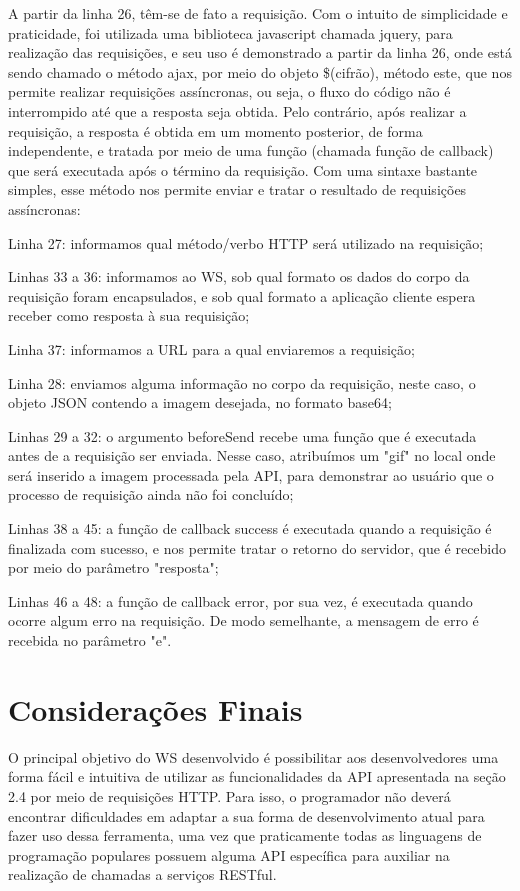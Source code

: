 \documentclass[12pt]{article}
\begin{document}
A partir da linha 26, têm-se de fato a requisição. Com o intuito de simplicidade e praticidade, foi utilizada uma biblioteca javascript chamada jquery, para realização das requisições, e seu uso é demonstrado a partir da linha 26, onde está sendo chamado o método ajax, por meio do objeto \$(cifrão), método este, que nos permite realizar requisições assíncronas, ou seja, o fluxo do código não é interrompido até que a resposta seja obtida. Pelo contrário, após realizar a requisição, a resposta é obtida em um momento posterior, de forma independente, e tratada por meio de uma função (chamada função de callback) que será executada após o término da requisição. Com uma sintaxe bastante simples, esse método nos permite enviar e tratar o resultado de requisições assíncronas:

Linha 27: informamos qual método/verbo HTTP será utilizado na requisição;

Linhas 33 a 36: informamos ao WS, sob qual formato os dados do corpo da requisição foram encapsulados, e sob qual formato a aplicação cliente espera receber como resposta à sua requisição;

Linha 37: informamos a URL para a qual enviaremos a requisição;

Linha 28: enviamos alguma informação no corpo da requisição, neste caso, o objeto JSON contendo a imagem desejada, no formato base64;

Linhas 29 a 32: o argumento beforeSend recebe uma função que é executada antes de a requisição ser enviada. Nesse caso, atribuímos um "gif" no local onde será inserido a imagem processada pela API, para demonstrar ao usuário que o processo de requisição ainda não foi concluído;

Linhas 38 a 45: a função de callback success é executada quando a requisição é finalizada com sucesso, e nos permite tratar o retorno do servidor, que é recebido por meio do parâmetro "resposta";

Linhas 46 a 48: a função de callback error, por sua vez, é executada quando ocorre algum erro na requisição. De modo semelhante, a mensagem de erro é recebida no parâmetro "e".

\section{Considerações Finais}

O principal objetivo do WS desenvolvido é possibilitar aos desenvolvedores uma forma fácil e intuitiva de utilizar as funcionalidades da API apresentada na seção 2.4 por meio de requisições HTTP. Para isso, o programador não deverá encontrar dificuldades em adaptar a sua forma de desenvolvimento atual para fazer uso dessa ferramenta, uma vez que praticamente todas as linguagens de programação populares possuem alguma API específica para auxiliar na realização de chamadas a serviços RESTful. 
\end{document}
